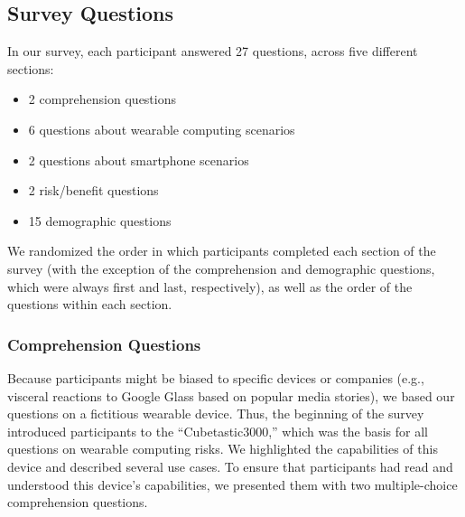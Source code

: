 \documentclass{acm_proc_article-sp}
\begin{document}

\subsection{Survey Questions}
In our survey, each participant answered 27 questions, across five different sections:   \\[-.8cm]

\begin{itemize} \itemsep1pt \parskip0pt 
\item 2 comprehension questions
\item 6 questions about wearable computing scenarios 
\item 2 questions about smartphone scenarios 
\item 2 risk/benefit questions 
\item 15 demographic questions \\[-.8cm]
\end{itemize}

We randomized the order in which participants completed each section of the survey (with the exception of the comprehension and demographic questions, which were always first and last, respectively), as well as the order of the questions within each section.

\subsubsection{Comprehension Questions}
Because participants might be biased to specific devices or companies (e.g., visceral reactions to Google Glass based on popular media stories), we based our questions on a fictitious wearable device. Thus, the beginning of the survey introduced participants to the ``Cubetastic3000,'' which was the basis for all questions on wearable computing risks. We highlighted the capabilities of this device and described several use cases. To ensure that participants had read and understood this device's capabilities, we presented them with two multiple-choice comprehension questions.
\end{document}
